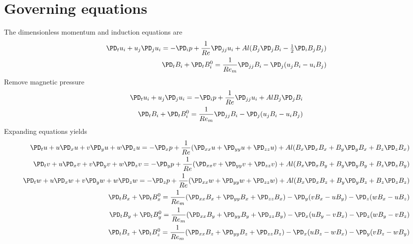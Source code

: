 \documentclass[11pt]{article}
\begin{document}
\doublespacing
\MOONSTITLE
\maketitle

\section{Governing equations}
The dimensionless momentum and induction equations are
\begin{equation}\begin{aligned}
\PD_t u_i+u_j\PD_j u_i = -\PD_i p+ \frac{1}{Re} \PD_{jj} u_i + Al (B_j \PD_j B_i - \tfrac{1}{2} \PD_i B_j B_j) \\
\PD_t B_i + \PD_t B_i^0 = \frac{1}{Re_m} \PD_{jj} B_i - \PD_j (u_j B_i - u_i B_j)
\end{aligned} \end{equation}
Remove magnetic pressure
\begin{equation}\begin{aligned}
\PD_t u_i+u_j\PD_j u_i = -\PD_i p+ \frac{1}{Re} \PD_{jj} u_i + Al B_j \PD_j B_i \\
\PD_t B_i + \PD_t B_i^0 = \frac{1}{Re_m} \PD_{jj} B_i - \PD_j (u_j B_i - u_i B_j)
\end{aligned} \end{equation}
Expanding equations yields
\small
\begin{equation}\begin{aligned}
\PD_t u+ u\PD_x u + v\PD_y u + w\PD_z u = -\PD_x p+ \frac{1}{Re} (\PD_{xx} u+\PD_{yy} u+\PD_{zz} u) + Al (B_x \PD_x B_x + B_y \PD_y B_x + B_z \PD_z B_x) \\
\PD_t v+ u\PD_x v + v\PD_y v + w\PD_z v = -\PD_y p+ \frac{1}{Re} (\PD_{xx} v+\PD_{yy} v+\PD_{zz} v) + Al (B_x \PD_x B_y + B_y \PD_y B_y + B_z \PD_z B_y) \\
\PD_t w+ u\PD_x w + v\PD_y w + w\PD_z w = -\PD_z p+ \frac{1}{Re} (\PD_{xx} w+\PD_{yy} w+\PD_{zz} w) + Al (B_x \PD_x B_z + B_y \PD_y B_z + B_z \PD_z B_z) \\
\PD_t B_x + \PD_t B_x^0 = \frac{1}{Re_m} (\PD_{xx} B_x + \PD_{yy} B_x+\PD_{zz} B_x)                         - \PD_y (v B_x - u B_y) - \PD_z (w B_x - u B_z) \\
\PD_t B_y + \PD_t B_y^0 = \frac{1}{Re_m} (\PD_{xx} B_y + \PD_{yy} B_y+\PD_{zz} B_y) - \PD_x (u B_y - v B_x)                         - \PD_z (w B_y - v B_z) \\
\PD_t B_z + \PD_t B_z^0 = \frac{1}{Re_m} (\PD_{xx} B_z + \PD_{yy} B_z+\PD_{zz} B_z) - \PD_x (u B_z - w B_x) - \PD_y (v B_z - w B_y)                         \\
\end{aligned} \end{equation}
\end{document}
